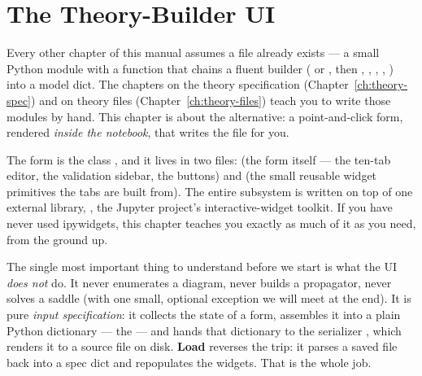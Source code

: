 \chapter{The Theory-Builder UI}\label{ch:ui}

Every other chapter of this manual assumes a 
file already exists --- a small Python module with a  function that
chains a fluent builder ( or
, then ,
, , ,
) into a model dict. The chapters on the theory specification
(Chapter~\ref{ch:theory-spec}) and on theory files (Chapter~\ref{ch:theory-files})
teach you to write those modules by hand. This chapter is about the alternative:
a point-and-click form, rendered \emph{inside the notebook}, that writes the file
for you.

The form is the class , and it lives in two files:
 (the form itself --- the ten-tab editor, the
validation sidebar, the buttons) and  (the small
reusable widget primitives the tabs are built from). The entire subsystem is
written on top of one external library, , the Jupyter project's
interactive-widget toolkit. If you have never used ipywidgets, this chapter
teaches you exactly as much of it as you need, from the ground up.

The single most important thing to understand before we start is what the UI
\emph{does not} do.  It never enumerates a diagram,
never builds a propagator, never solves a saddle (with one small, optional
exception we will meet at the end). It is pure \emph{input specification}: it
collects the state of a form, assembles it into a plain Python dictionary --- the
 --- and hands that dictionary to the serializer
, which renders it to a 
source file on disk. \textbf{Load} reverses the trip: it parses a saved file back
into a spec dict and repopulates the widgets. That is the whole job.

